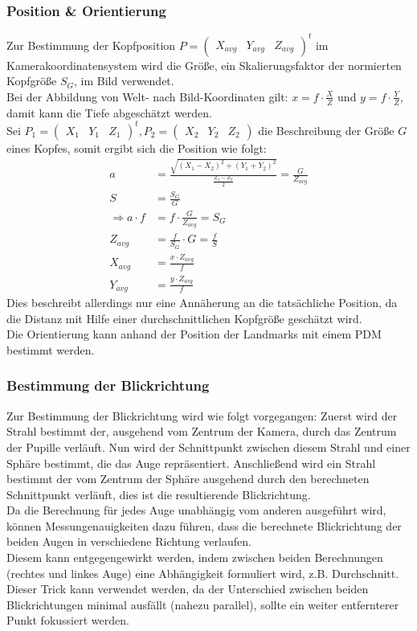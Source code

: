 \subsubsection{Position \& Orientierung}
\label{OpenFace_Pos_Ori}
Zur Bestimmung der Kopfposition $P= \begin{pmatrix}
X_{avg} & Y_{avg} & Z_{avg}
\end{pmatrix}^t$ im Kamerakoordinatensystem wird die Größe, ein Skalierungsfaktor der normierten Kopfgröße $S_G$, im Bild verwendet.\\
Bei der Abbildung von Welt- nach Bild-Koordinaten gilt: $x=f\cdot \frac{X}{Z}$ und $ y=f\cdot \frac{Y}{Z}$, damit kann die Tiefe abgeschätzt werden.\\
Sei $P_1 = \begin{pmatrix}
X_1&Y_1&Z_1
\end{pmatrix}^t, P_2= \begin{pmatrix}
X_2&Y_2&Z_2
\end{pmatrix}$ die Beschreibung der Größe $G$ eines Kopfes, somit ergibt sich die Position wie folgt:\\
\begin{align*}
a &= \frac{\sqrt{(X_1-X_2)^2+(Y_1+Y_2)^2}}{\frac{Z_1-Z_2}{2}} =\frac{G}{Z_{avg}}\\
S &= \frac{S_G}{G}\\
\Rightarrow a\cdot f &= f\cdot\frac{G}{Z_{avg}} = S_G\\
Z_{avg} &= \frac{f}{S_G}\cdot G = \frac{f}{S}\\
X_{avg} &= \frac{x \cdot Z_{avg}}{f}\\
Y_{avg} &= \frac{y \cdot Z_{avg}}{f}
\end{align*}
Dies beschreibt allerdings nur eine Annäherung an die tatsächliche Position, da die Distanz mit Hilfe einer durchschnittlichen Kopfgröße geschätzt wird.\\
Die Orientierung kann anhand der Position der Landmarks mit einem PDM bestimmt werden. \cite{OpenFace}
\subsubsection{Bestimmung der Blickrichtung}
\label{OpenFace_Blickrichtung}
Zur Bestimmung der Blickrichtung wird wie folgt vorgegangen: Zuerst wird der Strahl bestimmt der, ausgehend vom Zentrum der Kamera, durch das Zentrum der Pupille verläuft. Nun wird der Schnittpunkt zwischen diesem Strahl und einer Sphäre bestimmt, die das Auge repräsentiert. Anschließend wird ein Strahl bestimmt der vom Zentrum der Sphäre ausgehend durch den berechneten Schnittpunkt verläuft, dies ist die resultierende Blickrichtung.\cite{OpenFace}\\
Da die Berechnung für jedes Auge unabhängig vom anderen ausgeführt wird, können Messungenauigkeiten dazu führen, dass die berechnete Blickrichtung der beiden Augen in verschiedene Richtung verlaufen.\\
Diesem kann entgegengewirkt werden, indem zwischen beiden Berechnungen (rechtes und linkes Auge) eine Abhängigkeit formuliert wird, z.B. Durchschnitt.\\
Dieser Trick kann verwendet werden, da der Unterschied zwischen beiden Blickrichtungen minimal ausfällt (nahezu parallel), sollte ein weiter entfernterer Punkt fokussiert werden.
